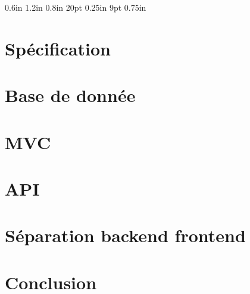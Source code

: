 \documentclass[12pt,oneside]{report}
\newcommand{\hsp}{\hspace{20pt}}
\begin{document}
\setmarginsrb{ 1.2in}   %
             { 0.6in}   %
             { 1.2in}   %
             { 0.8in}   %
             {  20pt}   %
             {0.25in}   %
             { 9pt}     %
             { 0.75in}  %



\titleformat{\chapter}[hang]{\Huge\bfseries}{\thechapter\hsp\textcolor{gray75}{|}\hsp}{0pt}{\Huge\bfseries}



\tableofcontents

\chapter{Spécification}

	\vspace{\baselineskip}
	

\chapter{Base de donnée}

	\vspace{\baselineskip}
	

\chapter{MVC}

	\vspace{\baselineskip}
	

\chapter{API}

	\vspace{\baselineskip}
	

\chapter{Séparation backend frontend}

	\vspace{\baselineskip}
	

\chapter{Conclusion}

	\vspace{\baselineskip}
	
	
\end{document}
